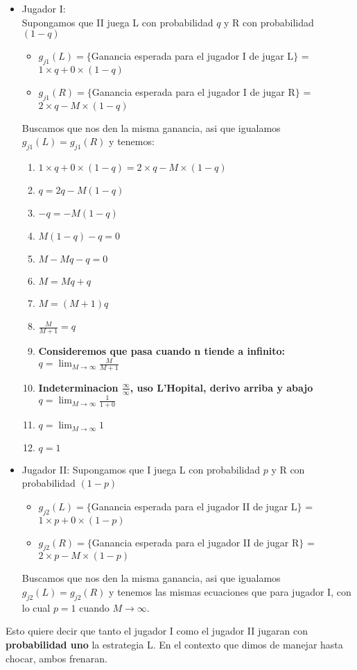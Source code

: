 \begin{itemize}
	\item Jugador I:\\
	Supongamos que II juega L con probabilidad $q$ y R con probabilidad $(1-q)$
	\begin{itemize}
		\item $g_{j1}(L) = \{$Ganancia esperada para el jugador I de jugar L$\}$ = $1 \times q + 0 \times (1-q)$ 
		\item $g_{j1}(R) = \{$Ganancia esperada para el jugador I  de jugar R$\}$ = $2 \times q - M \times (1-q)$ 
	\end{itemize}
	Buscamos que nos den la misma ganancia, asi que igualamos $g_{j1}(L) = g_{j1}(R)$ y tenemos:
	\begin{enumerate}
		\item $1 \times q + 0 \times (1-q) = 2 \times q - M \times (1-q)$ 
		\item $q = 2q - M(1-q)$ 
		\item $-q = - M(1-q)$ 
		\item $ M(1-q) -q = 0$ 
		\item $ M-Mq-q = 0$ 
		\item $ M = Mq+q$ 
		\item $ M = (M+1)q$ 
		\item $ \frac{M}{M+1} = q$ 
		\item \textbf{Consideremos que pasa cuando n tiende a infinito:} $ q = \displaystyle\lim_{M \to \infty} \frac{M}{M+1}$ 
		\item \textbf{Indeterminacion $\frac{\infty}{\infty}$, uso L'Hopital, derivo arriba y abajo} $ q = \displaystyle\lim_{M \to \infty} \frac{1}{1+0}$
		\item $ q = \displaystyle\lim_{M \to \infty} 1$ 
		\item $ q = 1$ 
	\end{enumerate}	

	\item Jugador II:
	Supongamos que I juega L con probabilidad $p$ y R con probabilidad $(1-p)$
	\begin{itemize}
		\item $g_{j2}(L) = \{$Ganancia esperada para el jugador II de jugar L$\}$ = $1 \times p + 0 \times (1-p)$ 
		\item $g_{j2}(R) = \{$Ganancia esperada para el jugador II  de jugar R$\}$ = $2 \times p - M \times (1-p)$ 
	\end{itemize}
	Buscamos que nos den la misma ganancia, asi que igualamos $g_{j2}(L) = g_{j2}(R)$ y tenemos las mismas ecuaciones que para jugador I, con lo cual $p=1$ cuando $M \to \infty$.
\end{itemize}
Esto quiere decir que tanto el jugador I como el jugador II jugaran con \textbf{probabilidad uno} la estrategia L. En el contexto que dimos de manejar hasta chocar, ambos frenaran.




